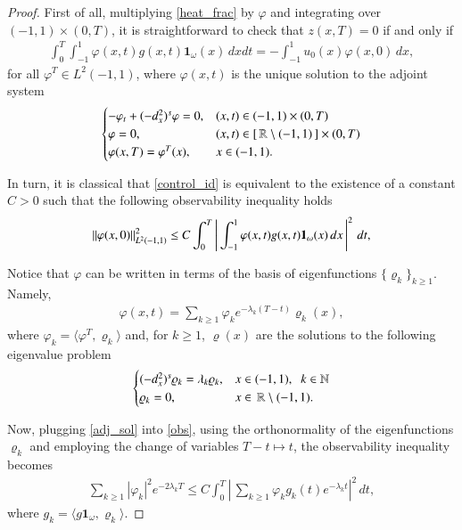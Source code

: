 \begin{proof}
First of all, multiplying \eqref{heat_frac} by $\varphi$ and integrating over $(-1,1)\times (0,T)$, it is straightforward to check that $z(x,T)=0$ if and only if 
\begin{align}\label{control_id}
	\int_0^T\int_{-1}^1 \varphi(x,t)g(x,t)\mathbf{1}_{\omega}(x)\,dxdt = -\int_{-1}^1 u_0(x)\varphi(x,0)\,dx,
\end{align}
for all $\varphi^T\in L^2(-1,1)$, where $\varphi(x,t)$ is the unique solution to the adjoint system
\begin{align}\label{heat_frac_adj}
	\begin{cases}
		-\varphi_t + (-d_x^2)^{s}\varphi = 0, & (x,t)\in (-1,1)\times(0,T)
		\\
		\varphi = 0, & (x,t)\in [\,\mathbb{R}\setminus(-1,1)\,]\times(0,T)
		\\
		\varphi(x,T) = \varphi^T(x), & x\in (-1,1).
	\end{cases}
\end{align}

In turn, it is classical that \eqref{control_id} is equivalent to the existence of a constant $C>0$ such that the following observability inequality holds
\begin{align}\label{obs}
	{\left\|\varphi(x,0)\right\|}_{L^2(-1,1)}^2\leq C\int_0^T\left|\,\int_{-1}^1 \varphi(x,t)g(x,t)\mathbf{1}_{\omega}(x)\,dx\,\right|^2\,dt,
\end{align}

Notice that $\varphi$ can be written in terms of the basis of eigenfunctions $\{\varrho_k\}_{k\geq 1}$. Namely,
\begin{align}\label{adj_sol}
	\varphi(x,t) = \sum_{k\geq 1} \varphi_ke^{-\lambda_k(T-t)}\varrho_k(x), 
\end{align}
where $\varphi_k = \langle \varphi^T,\varrho_k\rangle$ and, for $k\geq 1$, $\varrho(x)$ are the solutions to the following eigenvalue problem 
\begin{align*}
	\begin{cases}
		(-d_x^2)^{s}\varrho_k = \lambda_k\varrho_k, & x\in (-1,1), \;\; k\in\mathbb{N}
		\\
		\varrho_k = 0, & x\in \,\mathbb{R}\setminus(-1,1).
	\end{cases}
\end{align*}

Now, plugging \eqref{adj_sol} into \eqref{obs}, using the orthonormality of the eigenfunctions $\varrho_k$ and employing the change of variables $T-t\mapsto t$, the observability inequality becomes 
\begin{align}\label{obs_spectr}
	\sum_{k\geq 1} |\varphi_k|^2e^{-2\lambda_k T} \leq C\int_0^T\left|\,\sum_{k\geq 1} \varphi_kg_k(t)e^{-\lambda_k t}\right|^2\,dt, 
\end{align}
where $g_k = \langle g\mathbf{1}_{\omega},\varrho_k\rangle$. 


\end{proof}
